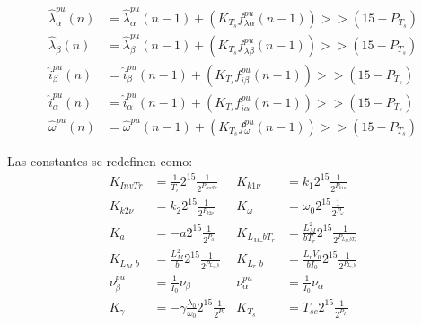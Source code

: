 \documentclass{article}
\begin{document}
        \begin{equation}
            \begin{aligned}
                \hat{\lambda}_\alpha^{pu}(n) &= \hat{\lambda}_\alpha^{pu}\left(n-1\right)
                    + \left( K_{T_s}  f_{\lambda\alpha}^{pu}\left(n-1\right) \right) >> \left(15-P_{T_s}\right) \\
                \hat{\lambda}_\beta(n) &= \hat{\lambda}_\beta^{pu}\left(n-1\right)
                    + \left(  K_{T_s} f_{\lambda\beta}^{pu} \left(n-1\right) \right) >> \left(15-P_{T_s}\right) \\
                \hat{i}_\beta^{pu}(n) &= \hat{i}_\beta^{pu} \left(n-1\right)
                    +  \left(  K_{T_s}  f_{i\beta}^{pu} \left(n-1\right) \right) >> \left(15-P_{T_s}\right) \\
                \hat{i}_\alpha^{pu}(n) &= \hat{i}_\alpha^{pu} \left(n-1\right) 
                    +  \left( K_{T_s} f_{i\alpha}^{pu} \left(n-1\right) \right) >> \left(15-P_{T_s}\right) \\
                \hat{\omega}^{pu}(n) &= \hat{\omega}^{pu} \left(n-1\right)
                    +  \left(  K_{T_s}  f_{\omega}^{pu}\left(n-1\right)  \right) >> \left(15-P_{T_s}\right)
            \end{aligned}
         \end{equation}

        Las constantes se redefinen como:
        \begin{equation}
            \begin{aligned}
                K_{InvTr}       &= \frac{1}{T_r}  2^{15} \frac{1}{2^{P_{InvTr}}}    &
                K_{k1\nu}       &= k_1 2^{15} \frac{1}{2^{P_{k1\nu} }}              \\
                K_{k2\nu}       &= k_2 2^{15} \frac{1}{2^{P_{k2\nu}  }}             &
                K_{\omega}      &= \omega_0 2^{15}   \frac{1}{2^{P_{\omega}  }}      \\
                K_a             &=    -a 2^{15}     \frac{1}{2^{P_a  }}             &
                K_{L_M\_bT_r}   &= \frac{L_M^2}{b T_r}2^{15} \frac{1}{2^{P_{L_M\_bT_r}  
                    }}  \\
                 K_{L_M\_b}     &=  \frac{L_M^2}{b}2^{15}  \frac{1}{2^{P_{L_M\_b}  }} &
                K_{L_r\_b}      &=  \frac{L_r V_0}{b I_0}2^{15}  \frac{1}{2^{P_{L_r\_b} 
                    }}  \\
                \nu_\beta^{pu}  &= \frac{1}{I_0} \nu_\beta                          &
                \nu_\alpha^{pu} &= \frac{1}{I_0} \nu_\alpha                         \\
                 K_\gamma       &= -\gamma \frac{\lambda_0}{\omega_0}2^{15}
                     \frac{1}{2^{P_\gamma  }}                                       &
                K_{T_s}         &= T_{sc} 2^{15}   \frac{1}{2^{P_{T_s} }}
            \end{aligned}
        \end{equation}
        
\end{document}
